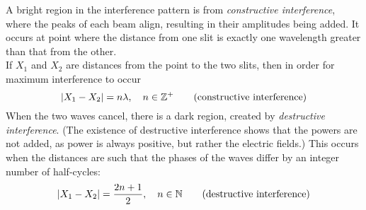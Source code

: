 \documentclass{subfiles}
\begin{document}
				A bright region in the interference pattern is from \textit{constructive interference}, where the peaks of each beam align, resulting in their amplitudes being added. It occurs at point where the distance from one slit is exactly one wavelength greater than that from the other. \\
				If \(X_1\) and \(X_2\) are distances from the point to the two slits, then in order for maximum interference to occur
					\[|X_1 - X_2| = n\lambda, \quad n \in \mathbb{Z}^+ \tag{constructive interference}\]
				When the two waves cancel, there is a dark region, created by \textit{destructive interference}. (The existence of destructive interference shows that the powers are not added, as power is always positive, but rather the electric fields.) This occurs when the distances are such that the phases of the waves differ by an integer number of half-cycles:
					\[|X_1 - X_2| = \frac{2n + 1}{2}, \quad n \in \mathbb{N} \tag{destructive interference}\]
\end{document}
